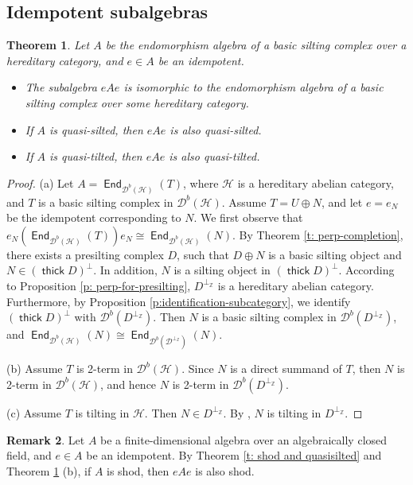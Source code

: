\documentclass[12pt,a4paper,reqno]{amsart}
\newtheorem{theorem}{Theorem}[section]
\theoremstyle{definition}
\newtheorem{remark}[theorem]{Remark}
\newcommand{\opname}[1]{\operatorname{\mathsf{#1}}}
\newcommand{\der}{\cd}
\newcommand{\thick}{\opname{thick}}
\newcommand{\End}{\opname{End}}
\newcommand{\cd}{{\mathcal D}}
\begin{document}
\subsection{Idempotent subalgebras} 

\begin{theorem}\label{p: idempotent-subalg-closed}
Let $A$ be the endomorphism algebra of a basic silting complex over a hereditary category, and $e\in A$ be an idempotent.
\begin{itemize}
    \item[(a)] The subalgebra $eAe$ is isomorphic to the endomorphism algebra of a basic silting complex over some hereditary category.
    \item[(b)] If $A$ is quasi-silted, then $eAe$ is also quasi-silted.
    \item[(c)] If $A$ is quasi-tilted, then $eAe$ is also quasi-tilted.
\end{itemize}
\end{theorem}
\begin{proof}
(a) Let $A = \End_{\der^b(\mathcal{H})}(T)$, where $\mathcal{H}$ is a hereditary abelian category, and $T$ is a basic silting complex in $\der^b(\mathcal{H})$. Assume $T = U\oplus N$, and let $e=e_N$ be the idempotent corresponding to $N$.
We  first observe that $e_N(\End_{\der^b(\mathcal{H})} (T))e_N \cong \End_{\der^b(\mathcal{H})}(N)$. By Theorem \ref{t: perp-completion}, there exists a presilting complex $D$, such that $D \oplus N$ is a basic silting object and $N \in (\thick D)^\perp$. In addition, $N$ is a silting object in $(\thick D)^\perp$. According to Proposition \ref{p: perp-for-presilting}, $D^{\perp_{\mathbb{Z}}}$ is a hereditary abelian category. Furthermore, by  Proposition \ref{p:identification-subcategory}, we identify $(\thick D)^\perp$ with $\der^b(D^{\perp_{\mathbb{Z}}})$. Then $N$ is a basic silting complex in $\der^b(D^{\perp_{\mathbb{Z}}})$, and $\End_{\der^b(\mathcal{H})}(N) \cong \End_{\der^b(\mathcal{D^{\perp_{\mathbb{Z}}}})}(N)$.

(b) Assume $T$ is 2-term in $\der^b(\mathcal{H})$. Since $N$ is a direct summand of $T$, then $N$ is 2-term in $\der^b(\mathcal{H})$, and hence $N$ is 2-term in $\der^b(D^{\perp_{\mathbb{Z}}})$.

(c) Assume $T$ is tilting in $\mathcal{H}$. Then $N \in D^{\perp_{\mathbb{Z}}}$. By \cite[Proposition 4.8]{BZ16b}, $N$ is tilting in $D^{\perp_{\mathbb{Z}}}$.
\end{proof}

\begin{remark} \label{r: shod is idem-subalg closed} Let $A$ be a finite-dimensional algebra over an algebraically closed field, and $e\in A$ be an idempotent. By Theorem \ref{t: shod and quasisilted} and Theorem \ref{p: idempotent-subalg-closed} (b), if $A$ is shod, then $eAe$ is also shod. 
\end{remark}
\end{document}
